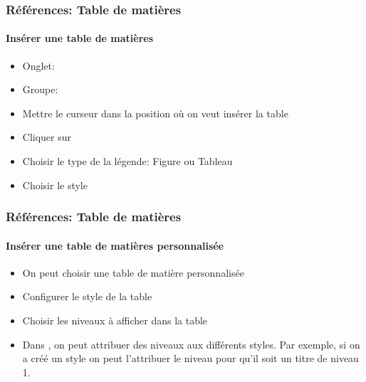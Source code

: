 \documentclass[xcolor=table]{beamer}
\begin{document}
\begin{frame}
\frametitle{Références: Table de matières}
\framesubtitle{Insérer une table de matières}

\begin{minipage}{0.59\textwidth}
	\begin{itemize}
		\item Onglet: 
		\item Groupe: 
		\item Mettre le curseur dans la position où on veut insérer la table
		\item Cliquer sur 
		\item Choisir le type de la légende: Figure ou Tableau
		\item Choisir le style
	\end{itemize}
\end{minipage}
\begin{minipage}{0.40\textwidth}
\end{minipage}

\end{frame}

\begin{frame}
\frametitle{Références: Table de matières}
\framesubtitle{Insérer une table de matières personnalisée}

\begin{minipage}{0.59\textwidth}
	\begin{itemize}
		\item On peut choisir une table de matière personnalisée
		\item Configurer le style de la table 
		\item Choisir les niveaux à afficher dans la table
		\item Dans , on peut attribuer des niveaux aux différents styles. 
		Par exemple, si on a créé un style  on peut l'attribuer le niveau  pour qu'il soit un titre de niveau 1.
	\end{itemize}
\end{minipage}
\begin{minipage}{0.40\textwidth}
	
\end{minipage}

\end{frame}
\end{document}

